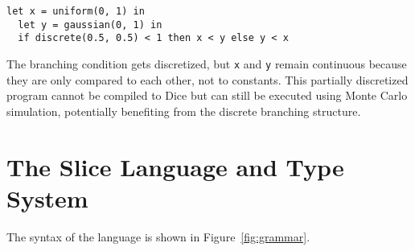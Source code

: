 \documentclass[acmsmall,screen,dvipsnames,x11names,nonacm,anonymous,review]{acmart}
\begin{document}
\begin{lstlisting}[aboveskip=1em,belowskip=1em]
  let x = uniform(0, 1) in
  let y = gaussian(0, 1) in
  if discrete(0.5, 0.5) < 1 then x < y else y < x
\end{lstlisting}

\noindent The branching condition gets discretized, but \texttt{x} and \texttt{y} remain continuous because they are only compared to each other, not to constants. This partially discretized program cannot be compiled to Dice but can still be executed using Monte Carlo simulation, potentially benefiting from the discrete branching structure.









\section{The Slice Language and Type System}\label{sec:language}

The syntax of the \Slice{} language is shown in Figure~\ref{fig:grammar}.
\end{document}
